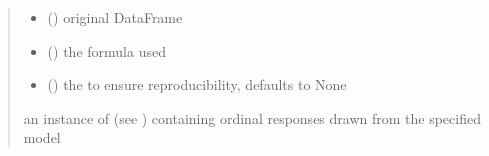 \documentclass[letterpaper,10pt,english]{sphinxmanual}
\begin{document}
\begin{fulllineitems}
\begin{quote}
\begin{description}
\begin{itemize}
\item {} 
\sphinxAtStartPar
{} () \textendash{} original DataFrame

\item {} 
\sphinxAtStartPar
{} () \textendash{} the formula used

\item {} 
\sphinxAtStartPar
{} (\sphinxstyleliteralemphasis{\sphinxupquote{, }}) \textendash{} the  to ensure reproducibility, defaults to None

\end{itemize}

\sphinxAtStartPar
an instance of  (see ) containing ordinal responses drawn from the specified model

\end{description}\end{quote}

\end{fulllineitems}

\end{document}
